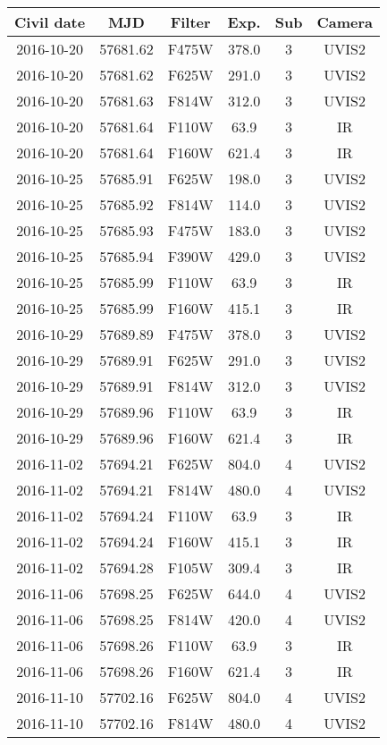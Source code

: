 \begin{tabular}{cccccc}
\hline\hline
Civil date & MJD & Filter & Exp. & Sub & Camera \\
\hline
2016-10-20 & 57681.62 & F475W & 378.0 & 3 & UVIS2 \\
2016-10-20 & 57681.62 & F625W & 291.0 & 3 & UVIS2 \\
2016-10-20 & 57681.63 & F814W & 312.0 & 3 & UVIS2 \\
2016-10-20 & 57681.64 & F110W & 63.9 & 3 & IR \\
2016-10-20 & 57681.64 & F160W & 621.4 & 3 & IR \\
2016-10-25 & 57685.91 & F625W & 198.0 & 3 & UVIS2 \\
2016-10-25 & 57685.92 & F814W & 114.0 & 3 & UVIS2 \\
2016-10-25 & 57685.93 & F475W & 183.0 & 3 & UVIS2 \\
2016-10-25 & 57685.94 & F390W & 429.0 & 3 & UVIS2 \\
2016-10-25 & 57685.99 & F110W & 63.9 & 3 & IR \\
2016-10-25 & 57685.99 & F160W & 415.1 & 3 & IR \\
2016-10-29 & 57689.89 & F475W & 378.0 & 3 & UVIS2 \\
2016-10-29 & 57689.91 & F625W & 291.0 & 3 & UVIS2 \\
2016-10-29 & 57689.91 & F814W & 312.0 & 3 & UVIS2 \\
2016-10-29 & 57689.96 & F110W & 63.9 & 3 & IR \\
2016-10-29 & 57689.96 & F160W & 621.4 & 3 & IR \\
2016-11-02 & 57694.21 & F625W & 804.0 & 4 & UVIS2 \\
2016-11-02 & 57694.21 & F814W & 480.0 & 4 & UVIS2 \\
2016-11-02 & 57694.24 & F110W & 63.9 & 3 & IR \\
2016-11-02 & 57694.24 & F160W & 415.1 & 3 & IR \\
2016-11-02 & 57694.28 & F105W & 309.4 & 3 & IR \\
2016-11-06 & 57698.25 & F625W & 644.0 & 4 & UVIS2 \\
2016-11-06 & 57698.25 & F814W & 420.0 & 4 & UVIS2 \\
2016-11-06 & 57698.26 & F110W & 63.9 & 3 & IR \\
2016-11-06 & 57698.26 & F160W & 621.4 & 3 & IR \\
2016-11-10 & 57702.16 & F625W & 804.0 & 4 & UVIS2 \\
2016-11-10 & 57702.16 & F814W & 480.0 & 4 & UVIS2 \\

\end{tabular}
